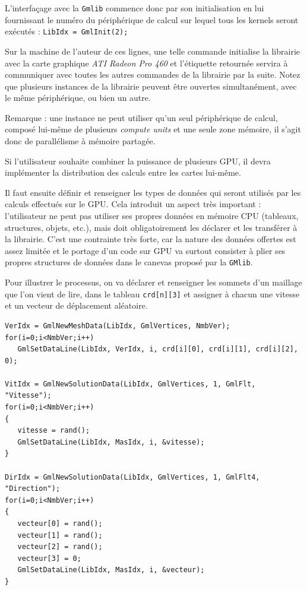 \documentclass[a4paper,12pt]{article}
\begin{document}
L'interfaçage avec la {\tt Gmlib} commence donc par son initialisation en lui fournissant le numéro du périphérique de calcul sur lequel tous les kernels seront exécutés : {\tt LibIdx = GmlInit(2);}

Sur la machine de l'auteur de ces lignes, une telle commande initialise la librairie avec la carte graphique \emph{ATI Radeon Pro 460} et l'étiquette retournée servira à communiquer avec toutes les autres commandes de la librairie par la suite.
Notez que plusieurs instances de la librairie peuvent être ouvertes simultanément, avec le même périphérique, ou bien un autre.

Remarque : une instance ne peut utiliser qu'un seul périphérique de calcul, composé lui-même de plusieurs \emph{compute units} et une seule zone mémoire, il s'agit donc de parallélisme à mémoire partagée.

Si l'utilisateur souhaite combiner la puissance de plusieurs GPU, il devra implémenter la distribution des calculs entre les cartes lui-même.

Il faut ensuite définir et renseigner les types de données qui seront utilisés par les calculs effectués sur le GPU. Cela introduit un aspect très important : l'utilisateur ne peut pas utiliser ses propres données en mémoire CPU (tableaux, structures, objets, etc.), mais doit obligatoirement les déclarer et les transférer à la librairie. C'est une contrainte très forte, car la nature des données offertes est assez limitée et le portage d'un code sur GPU va surtout consister à plier ses propres structures de données dans le canevas proposé par la {\tt GMlib}.

Pour illustrer le processus, on va déclarer et renseigner les sommets d'un maillage que l'on vient de lire, dans le tableau {\tt crd[n][3]} et assigner à chacun une vitesse et un vecteur de déplacement aléatoire.

\begin{tt}
\begin{verbatim}
VerIdx = GmlNewMeshData(LibIdx, GmlVertices, NmbVer);
for(i=0;i<NmbVer;i++)
   GmlSetDataLine(LibIdx, VerIdx, i, crd[i][0], crd[i][1], crd[i][2], 0);

VitIdx = GmlNewSolutionData(LibIdx, GmlVertices, 1, GmlFlt, "Vitesse");
for(i=0;i<NmbVer;i++)
{
   vitesse = rand();
   GmlSetDataLine(LibIdx, MasIdx, i, &vitesse);
}

DirIdx = GmlNewSolutionData(LibIdx, GmlVertices, 1, GmlFlt4, "Direction");
for(i=0;i<NmbVer;i++)
{
   vecteur[0] = rand();
   vecteur[1] = rand();
   vecteur[2] = rand();
   vecteur[3] = 0;
   GmlSetDataLine(LibIdx, MasIdx, i, &vecteur);
}
\end{verbatim}
\end{tt}
\normalfont
\end{document}
